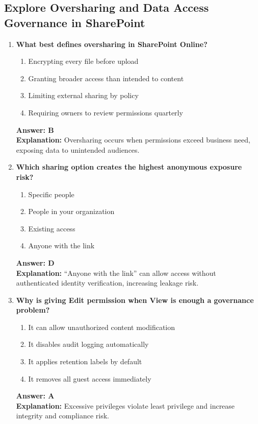 \documentclass[10pt]{article}
\begin{document}
\clearpage
\subsection{Explore Oversharing and Data Access Governance in SharePoint}
\begin{enumerate}[leftmargin=*]

\item \textbf{What best defines oversharing in SharePoint Online?}
\begin{enumerate}[label=\Alph*.]
  \item Encrypting every file before upload
  \item Granting broader access than intended to content
  \item Limiting external sharing by policy
  \item Requiring owners to review permissions quarterly
\end{enumerate}
\textbf{Answer: B}\\
\textbf{Explanation:} Oversharing occurs when permissions exceed business need, exposing data to unintended audiences.

\item \textbf{Which sharing option creates the highest anonymous exposure risk?}
\begin{enumerate}[label=\Alph*.]
  \item Specific people
  \item People in your organization
  \item Existing access
  \item Anyone with the link
\end{enumerate}
\textbf{Answer: D}\\
\textbf{Explanation:} ``Anyone with the link'' can allow access without authenticated identity verification, increasing leakage risk.

\item \textbf{Why is giving Edit permission when View is enough a governance problem?}
\begin{enumerate}[label=\Alph*.]
  \item It can allow unauthorized content modification
  \item It disables audit logging automatically
  \item It applies retention labels by default
  \item It removes all guest access immediately
\end{enumerate}
\textbf{Answer: A}\\
\textbf{Explanation:} Excessive privileges violate least privilege and increase integrity and compliance risk.


\end{enumerate}
\end{document}

